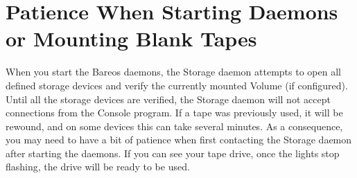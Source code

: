 %
%
% 
% 
% 
% 
% 
% 

\section{Patience When Starting Daemons or Mounting Blank Tapes}

When you start the Bareos daemons, the Storage daemon attempts to open all
defined storage devices and verify the currently mounted Volume (if
configured). Until all the storage devices are verified, the Storage daemon
will not accept connections from the Console program. If a tape was previously
used, it will be rewound, and on some devices this can take several minutes.
As a consequence, you may need to have a bit of patience when first contacting
the Storage daemon after starting the daemons. If you can see your tape drive,
once the lights stop flashing, the drive will be ready to be used.


